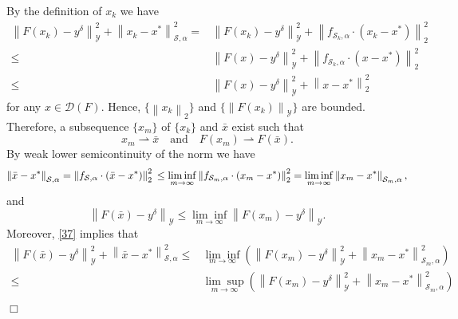 \documentclass[10pt,a4paper]{amsart}
\newenvironment{proof}{{\em Proof.}}{$\Box$}
\begin{document}
\begin{proof}
By the definition of $ x_k $ we have
\begin{equation}\label{37}
\begin{aligned}
\left\|F(x_k) - y^\delta\right\|^2_\mathcal{Y} + \left\|x_k - x^*\right\|_{\mathcal{S}, \alpha}^2
=
&\left\|F(x_k) - y^\delta\right\|^2_\mathcal{Y} + \left\|f_{\mathcal{S}_k,\alpha}\cdot (x_k-x^*)\right\|_2^2\\
\leq 
&\left\|F(x) - y^\delta\right\|^2_\mathcal{Y} + \left\|f_{\mathcal{S}_k,\alpha}\cdot (x-x^*)\right\|_2^2\\
\leq 
&\left\|F(x) - y^\delta\right\|^2_\mathcal{Y} + \left\|x-x^*\right\|_2^2
\end{aligned}
\end{equation}
for any $ x\in \mathcal{D}(F) $. Hence, $ \{\left\|x_k\right\|_2\} $ and $ \{\left\|F(x_k)\right\|_\mathcal{Y}\} $ are bounded. Therefore, a subsequence $ \{x_m\} $ of $ \{x_k\} $ and $\bar{x}$ exist such that
\begin{displaymath}
x_m\rightharpoonup\bar{x}\quad \mathrm{and}\quad F(x_m)\rightharpoonup F(\bar{x}).
\end{displaymath}
By weak lower semicontinuity of the norm we have
\begin{displaymath}
\left\|\bar{x} - x^*\right\|_{\mathcal{S}, \alpha} = \left\|f_{\mathcal{S},\alpha}\cdot (\bar{x}-x^*)\right\|_2^2\\
\leq
\underset{m\to \infty}{\lim\inf}\left\|f_{\mathcal{S}_m,\alpha}\cdot (x_m-x^*)\right\|_2^2 = \underset{m\to \infty}{\lim\inf}\left\|x_m - x^*\right\|_{\mathcal{S}_m, \alpha},
\end{displaymath}
and
\begin{equation}\label{38}
\left\|F(\bar{x}) - y^\delta\right\|_\mathcal{Y}\leq \underset{m\to \infty}{\lim\inf}\left\|F(x_m) - y^\delta\right\|_\mathcal{Y}.
\end{equation}
Moreover, \eqref{37} implies that
\begin{displaymath}
\begin{aligned}
\left\|F(\bar{x}) - y^\delta\right\|^2_\mathcal{Y} + \left\|\bar{x} - x^*\right\|_{\mathcal{S}, \alpha}^2
\leq 
&\underset{m\to \infty}{\lim\inf}\left(\left\|F(x_m) - y^\delta\right\|^2_\mathcal{Y} + \left\|x_m - x^*\right\|_{\mathcal{S}_m, \alpha}^2\right)\\
\leq 
&\underset{m\to \infty}{\lim\sup}\left(\left\|F(x_m) - y^\delta\right\|^2_\mathcal{Y} + \left\|x_m - x^*\right\|_{\mathcal{S}_m, \alpha}^2\right)\\

\end{aligned}
\end{displaymath}
\end{proof}
\end{document}
